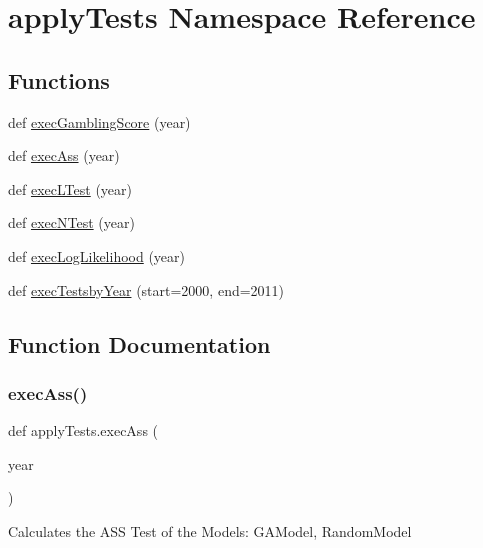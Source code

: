\hypertarget{namespaceapply_tests}{}\section{apply\+Tests Namespace Reference}
\label{namespaceapply_tests}
\subsection*{Functions}
\begin{DoxyCompactItemize}
\item 
def \hyperlink{namespaceapply_tests_ad9905c5ad071003f8de9a655576459bf}{exec\+Gambling\+Score} (year)
\item 
def \hyperlink{namespaceapply_tests_a8b5b16bfc44d7607f40dbefccc4d09dd}{exec\+Ass} (year)
\item 
def \hyperlink{namespaceapply_tests_a97febc347b565f9f65453be69ad57351}{exec\+L\+Test} (year)
\item 
def \hyperlink{namespaceapply_tests_a2f1699d6cdaf976904aa7ce633ec488b}{exec\+N\+Test} (year)
\item 
def \hyperlink{namespaceapply_tests_a5670d015fa02efcf8e1b7a8a99e45166}{exec\+Log\+Likelihood} (year)
\item 
def \hyperlink{namespaceapply_tests_ab58e69822c644f8937db0e45f6981979}{exec\+Testsby\+Year} (start=2000, end=2011)
\end{DoxyCompactItemize}


\subsection{Function Documentation}
\mbox{\label{namespaceapply_tests_a8b5b16bfc44d7607f40dbefccc4d09dd}} 
\subsubsection{\texorpdfstring{exec\+Ass()}{execAss()}}
{\footnotesize\ttfamily def apply\+Tests.\+exec\+Ass (\begin{DoxyParamCaption}\item[{}]{year }\end{DoxyParamCaption})}

\begin{DoxyVerb}Calculates the ASS Test
of the Models: GAModel, RandomModel
\end{DoxyVerb}
 

